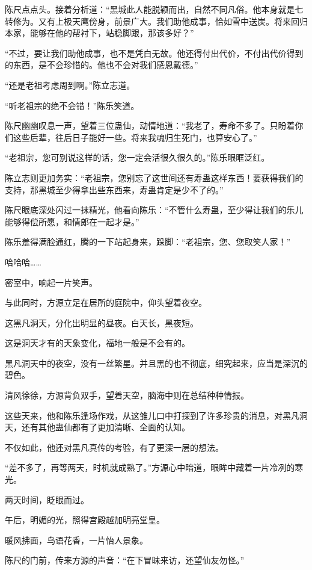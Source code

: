 \begin{this_body}
陈尺点点头。接着分析道：“黑城此人能脱颖而出，自然不同凡俗。他本身就是七转修为。又有上极天鹰傍身，前景广大。我们助他成事，恰如雪中送炭。将来回归本家，能够在他的帮衬下，站稳脚跟，那该多好？”

“不过，要让我们助他成事，也不是凭白无故。他还得付出代价，不付出代价得到的东西，是不会珍惜的。他也不会对我们感恩戴德。”

“还是老祖考虑周到啊。”陈立志道。

“听老祖宗的绝不会错！”陈乐笑道。

陈尺幽幽叹息一声，望着三位蛊仙，动情地道：“我老了，寿命不多了。只盼着你们这些后辈，往后日子能好一些。将来我魂归生死门，也算安心了。”

“老祖宗，您可别说这样的话，您一定会活很久很久的。”陈乐眼眶泛红。

陈立志则更加务实：“老祖宗，您别忘了这世间还有寿蛊这样东西！要获得我们的支持，那黑城至少得拿出些东西来，寿蛊肯定是少不了的。”

陈尺眼底深处闪过一抹精光，他看向陈乐：“不管什么寿蛊，至少得让我们的乐儿能够得偿所愿，和情郎在一起才是。”

陈乐羞得满脸通红，腾的一下站起身来，跺脚：“老祖宗，您、您取笑人家！”

哈哈哈……

密室中，响起一片笑声。

与此同时，方源立足在居所的庭院中，仰头望着夜空。

这黑凡洞天，分化出明显的昼夜。白天长，黑夜短。

这是洞天才有的天象变化，福地一般是不会有的。

黑凡洞天中的夜空，没有一丝繁星。并且黑的也不彻底，细究起来，应当是深沉的碧色。

清风徐徐，方源背负双手，望着天空，脑海中则在总结种种情报。

这些天来，他和陈乐逢场作戏，从这雏儿口中打探到了许多珍贵的消息，对黑凡洞天，还有其他蛊仙都有了更加清晰、全面的认知。

不仅如此，他还对黑凡真传的考验，有了更深一层的想法。

“差不多了，再等两天，时机就成熟了。”方源心中暗道，眼眸中藏着一片冷冽的寒光。

两天时间，眨眼而过。

午后，明媚的光，照得宫殿越加明亮堂皇。

暖风拂面，鸟语花香，一片怡人景象。

陈尺的门前，传来方源的声音：“在下冒昧来访，还望仙友勿怪。”


\end{this_body}
